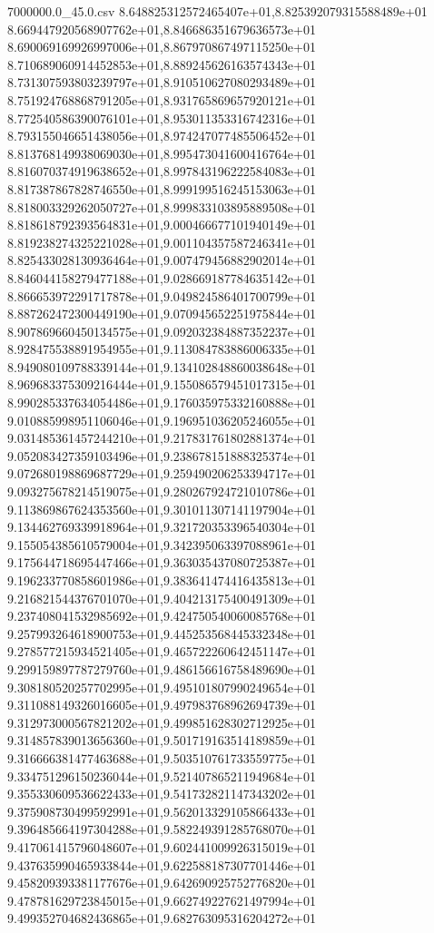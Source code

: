 \begin{filecontents*}{7000000.0_45.0.csv}
8.648825312572465407e+01,8.825392079315588489e+01
8.669447920568907762e+01,8.846686351679636573e+01
8.690069169926997006e+01,8.867970867497115250e+01
8.710689060914452853e+01,8.889245626163574343e+01
8.731307593803239797e+01,8.910510627080293489e+01
8.751924768868791205e+01,8.931765869657920121e+01
8.772540586390076101e+01,8.953011353316742316e+01
8.793155046651438056e+01,8.974247077485506452e+01
8.813768149938069030e+01,8.995473041600416764e+01
8.816070374919638652e+01,8.997843196222584083e+01
8.817387867828746550e+01,8.999199516245153063e+01
8.818003329262050727e+01,8.999833103895889508e+01
8.818618792393564831e+01,9.000466677101940149e+01
8.819238274325221028e+01,9.001104357587246341e+01
8.825433028130936464e+01,9.007479456882902014e+01
8.846044158279477188e+01,9.028669187784635142e+01
8.866653972291717878e+01,9.049824586401700799e+01
8.887262472300449190e+01,9.070945652251975844e+01
8.907869660450134575e+01,9.092032384887352237e+01
8.928475538891954955e+01,9.113084783886006335e+01
8.949080109788339144e+01,9.134102848860038648e+01
8.969683375309216444e+01,9.155086579451017315e+01
8.990285337634054486e+01,9.176035975332160888e+01
9.010885998951106046e+01,9.196951036205246055e+01
9.031485361457244210e+01,9.217831761802881374e+01
9.052083427359103496e+01,9.238678151888325374e+01
9.072680198869687729e+01,9.259490206253394717e+01
9.093275678214519075e+01,9.280267924721010786e+01
9.113869867624353560e+01,9.301011307141197904e+01
9.134462769339918964e+01,9.321720353396540304e+01
9.155054385610579004e+01,9.342395063397088961e+01
9.175644718695447466e+01,9.363035437080725387e+01
9.196233770858601986e+01,9.383641474416435813e+01
9.216821544376701070e+01,9.404213175400491309e+01
9.237408041532985692e+01,9.424750540060085768e+01
9.257993264618900753e+01,9.445253568445332348e+01
9.278577215934521405e+01,9.465722260642451147e+01
9.299159897787279760e+01,9.486156616758489690e+01
9.308180520257702995e+01,9.495101807990249654e+01
9.311088149326016605e+01,9.497983768962694739e+01
9.312973000567821202e+01,9.499851628302712925e+01
9.314857839013656360e+01,9.501719163514189859e+01
9.316666381477463688e+01,9.503510761733559775e+01
9.334751296150236044e+01,9.521407865211949684e+01
9.355330609536622433e+01,9.541732821147343202e+01
9.375908730499592991e+01,9.562013329105866433e+01
9.396485664197304288e+01,9.582249391285768070e+01
9.417061415796048607e+01,9.602441009926315019e+01
9.437635990465933844e+01,9.622588187307701446e+01
9.458209393381177676e+01,9.642690925752776820e+01
9.478781629723845015e+01,9.662749227621497994e+01
9.499352704682436865e+01,9.682763095316204272e+01

\end{filecontents*}
